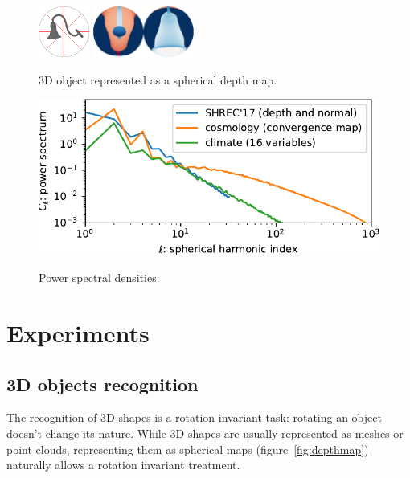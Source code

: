 \documentclass{article} %
\newcommand{\todo}[1]{{\color[rgb]{.6,.1,.6}{#1}}}
\newcommand{\figref}[1]{figure~\ref{fig:#1}}
\begin{document}
\begin{figure}
\begin{minipage}{0.35\linewidth}
		\includegraphics[height=4.5em]{lamp_000018}
		\hfill
		\includegraphics[height=4.5em]{lamp_000018_sphere_nobar}
		\caption{3D object represented as a spherical depth map.}
		\label{fig:depthmap}
		\vspace{1em}
		\includegraphics[width=\linewidth]{spectrum}
		\caption{Power spectral densities.}
		\label{fig:spectrum}
	\end{minipage}
\end{figure}

\section{Experiments}


\subsection{3D objects recognition} \label{sec:exp:shrec}

The recognition of 3D shapes is a rotation invariant task: rotating an object doesn't change its nature.
While 3D shapes are usually represented as meshes or point clouds, representing them as spherical maps (\figref{depthmap}) naturally allows a rotation invariant treatment.
\end{document}
